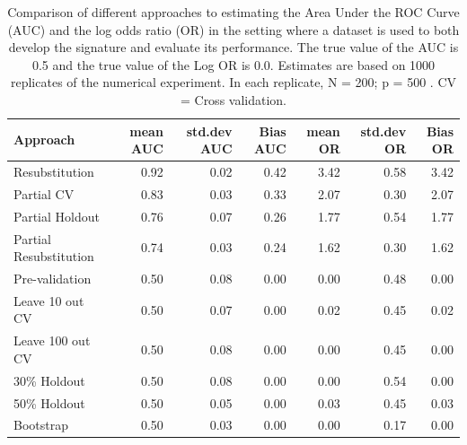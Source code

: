 \documentclass[11pt,]{article}
\begin{document}
\begin{table}

\caption{Comparison of different approaches to estimating the Area Under the ROC Curve (AUC) and the log odds ratio (OR) in the setting where a dataset is used to both develop the signature and evaluate its performance. The true value of the AUC is 0.5 and the true value of the Log OR is 0.0. Estimates are based on 1000 replicates of the numerical experiment. In each replicate,  N = 200; p = 500 . CV = Cross validation. }
\centering
\begin{tabular}[t]{l|r|r|r|r|r|r}
\hline
Approach & mean AUC & std.dev AUC & Bias AUC & mean OR & std.dev OR & Bias OR\\
\hline
Resubstitution & 0.92 & 0.02 & 0.42 & 3.42 & 0.58 & 3.42\\
\hline
Partial CV & 0.83 & 0.03 & 0.33 & 2.07 & 0.30 & 2.07\\
\hline
Partial Holdout & 0.76 & 0.07 & 0.26 & 1.77 & 0.54 & 1.77\\
\hline
Partial Resubstitution & 0.74 & 0.03 & 0.24 & 1.62 & 0.30 & 1.62\\
\hline
Pre-validation & 0.50 & 0.08 & 0.00 & 0.00 & 0.48 & 0.00\\
\hline
Leave 10 out CV & 0.50 & 0.07 & 0.00 & 0.02 & 0.45 & 0.02\\
\hline
Leave 100 out CV & 0.50 & 0.08 & 0.00 & 0.00 & 0.45 & 0.00\\
\hline
30\% Holdout & 0.50 & 0.08 & 0.00 & 0.00 & 0.54 & 0.00\\
\hline
50\% Holdout & 0.50 & 0.05 & 0.00 & 0.03 & 0.45 & 0.03\\
\hline
Bootstrap & 0.50 & 0.03 & 0.00 & 0.00 & 0.17 & 0.00\\
\hline
\end{tabular}
\end{table}
\end{document}
